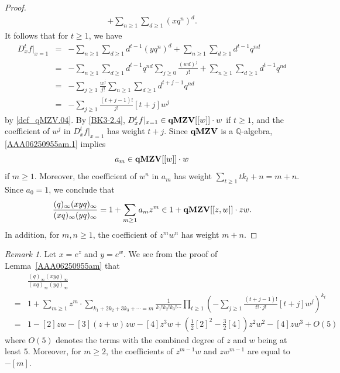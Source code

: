 \documentclass[12pt, reqno]{amsart}
\theoremstyle{definition}
\theoremstyle{remark}
\newtheorem{remark}[theorem]{Remark}
\numberwithin{equation}{section}
\newcommand{\Q}{ \mathbb Q }
\newcommand{\qMZV}{ {\bf qMZV} }
\numberwithin{equation}{section}
\begin{document}
\begin{proof}
\begin{eqnarray*}
   + \sum_{n \ge 1} \sum_{d \ge 1} (xq^n)^d.
\end{eqnarray*} 
It follows that for $t \ge 1$, we have
\begin{eqnarray*} 
   D_x^tf|_{x=1}
&=&-\sum_{n \ge 1} \sum_{d \ge 1} d^{t-1} (yq^n)^d 
   + \sum_{n \ge 1} \sum_{d \ge 1} d^{t-1} q^{nd} \\
&=&-\sum_{n \ge 1} \sum_{d \ge 1} d^{t-1}q^{nd} \sum_{j \ge 0} 
   \frac{(w d)^j}{j!} 
   + \sum_{n \ge 1} \sum_{d \ge 1} d^{t-1} q^{nd}  \\
&=&-\sum_{j \ge 1} \frac{w^j}{j!}
   \sum_{n \ge 1} \sum_{d \ge 1} d^{t+j-1}q^{nd}   \\
&=&-\sum_{j \ge 1} \frac{(t+j-1)!}{j!} [t+j] w^j
\end{eqnarray*} 
by \eqref{def_qMZV.04}. 
By \eqref{BK3-2.4}, $D_x^tf|_{x=1} \in \qMZV[[w]] \cdot w$ 
if $t \ge 1$, and the coefficient of $w^j$ in $D_x^tf|_{x=1}$ 
has weight $t+j$. Since $\qMZV$ is a $\Q$-algebra, 
\eqref{AAA06250955am.1} implies 
$$
a_{m} \in \qMZV[[w]]\cdot w
$$
if $m \ge 1$. Moreover, the coefficient of $w^n$ in $a_m$ 
has weight 
$
\sum_{t \ge 1} tk_t+n = m+n. 
$
Since $a_0 = 1$, we conclude that 
$$
\frac{(q)_\infty (xyq)_\infty}{(xq)_\infty (yq)_\infty} 
= 1 + \sum_{m \ge 1} a_m z^m
\in 1 + \qMZV[[z, w]] \cdot zw. 
$$
In addition, for $m,n \ge 1$, the coefficient of $z^m w^n$ has weight $m+n$.
\end{proof}

\begin{remark}   \label{AAA07020913am}
Let $x = e^{z}$ and $y = e^{w}$.
We see from the proof of Lemma~\ref{AAA06250955am} that
\begin{eqnarray*}     
& &\frac{(q)_\infty (xyq)_\infty}{(xq)_\infty (yq)_\infty}   \\
&=&1 + \sum_{m \ge 1} z^m \cdot \sum_{k_1+2k_2+3k_3+\cdots = m}
  \frac{1}{k_1! k_2! k_3! \cdots} \prod_{t \ge 1}
  \left (-\sum_{j \ge 1} \frac{(t+j-1)!}{t! \cdot j!} [t+j] 
  w^j\right )^{k_t}    \\
&=&1 - [2]zw - [3] (z + w)zw - [4]z^3 w 
   + \left (\frac12 [2]^2 - \frac32 [4] \right ) z^2 w^2 
   - [4]z w^3 + O(5)
\end{eqnarray*}
where $O(5)$ denotes the terms with the combined degree of $z$ and $w$ 
being at least $5$. Moreover, for $m \ge 2$, 
the coefficients of $z^{m-1} w$ and $zw^{m-1}$ are equal to $-[m]$.
\end{remark}
\end{document}
